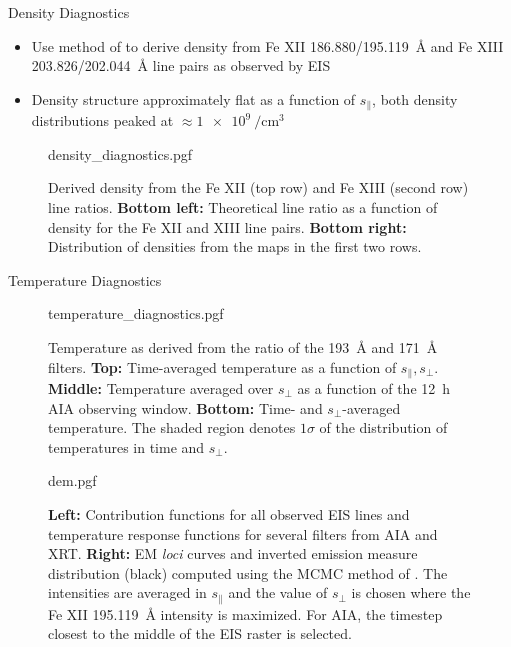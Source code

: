 \documentclass[final]{beamer}
\newlength{\colwidth}
\begin{document}
\begin{frame}[t]
\begin{columns}[t]
\begin{column}{\colwidth}
\begin{block}{Density Diagnostics}
    \begin{itemize}
      \item Use method of \citet{young_high-precision_2009} to derive density from Fe XII \SI{186.880/195.119}{\angstrom} and Fe XIII \SI{203.826/202.044}{\angstrom} line pairs as observed by EIS
      \item Density structure approximately flat as a function of $s_\parallel$, both \alert{density distributions peaked at $\approx\SI{1e9}{\per\cm\cubed}$}
    \end{itemize}
    \vspace{-50px}
    \begin{figure}
      \centering
      {density_diagnostics.pgf}
      \caption{Derived density from the Fe XII (top row) and Fe XIII (second row) line ratios. \textbf{Bottom left:} Theoretical line ratio as a function of density for the Fe XII and XIII line pairs. \textbf{Bottom right:} Distribution of densities from the maps in the first two rows.}
      \label{fig:density_diagnostic}   
    \end{figure}

  \end{block}
  \vspace{-30pt}
  \begin{block}{Temperature Diagnostics}

    \vspace{-30pt}

    \begin{figure}[H]
      \centering
      {temperature_diagnostics.pgf}
      \caption{Temperature as derived from the ratio of the \SI{193}{\angstrom} and \SI{171}{\angstrom} filters. \textbf{Top:} Time-averaged temperature as a function of $s_\parallel,s_\perp$. \textbf{Middle:} Temperature averaged over $s_\perp$ as a function of the \SI{12}{\hour} AIA observing window. \textbf{Bottom:} Time- and $s_\perp$-averaged temperature. The shaded region denotes $1\sigma$ of the distribution of temperatures in time and $s_\perp$.}
      \label{fig:filter_ratio}
    \end{figure}

    \begin{figure}[H]
      \centering
      {dem.pgf}
      \caption{\textbf{Left:} Contribution functions for all observed EIS lines and temperature response functions for several filters from AIA and XRT. \textbf{Right:} EM \textit{loci} curves and inverted emission measure distribution (black) computed using the MCMC method of \citet{kashyap_markov-chain_1998}. The intensities are averaged in $s_\parallel$ and the value of $s_\perp$ is chosen where the Fe XII \SI{195.119}{\angstrom} intensity is maximized. For AIA, the timestep closest to the middle of the EIS raster is selected.}
      \label{fig:dem_observed}
    \end{figure}


\end{block}
\end{column}
\end{columns}
\end{frame}
\end{document}
